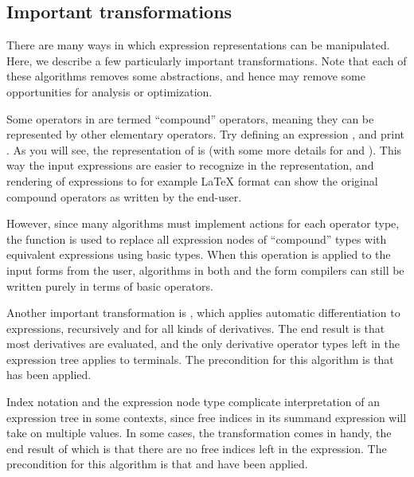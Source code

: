 \subsection{Important transformations} \label{ufl:sec:expanding}

There are many ways in which expression representations can be
manipulated.  Here, we describe a few particularly important
transformations.  Note that each of these algorithms removes some
abstractions, and hence may remove some opportunities for analysis or
optimization.

Some operators in \ufl{} are termed ``compound'' operators,
meaning they can be represented by other elementary operators.
Try defining an expression ,
and print . As you will see, the representation
of  is  (with some more
details for  and ).
This way the input expressions are easier to recognize in the
representation, and rendering of expressions to for example
\LaTeX{} format can show the original compound operators
as written by the end-user.

However, since many algorithms must implement actions for each
operator type, the function  is used to
replace all expression nodes of ``compound'' types with equivalent
expressions using basic types. When this operation is applied to the
input forms from the user, algorithms in both \ufl{} and the form
compilers can still be written purely in terms of basic operators.

Another important transformation is , which
applies automatic differentiation to expressions, recursively and for
all kinds of derivatives.  The end result is that most derivatives are
evaluated, and the only derivative operator types left in the
expression tree applies to terminals. The precondition for this
algorithm is that  has been applied.

Index notation and the  expression node type
complicate interpretation of an expression tree in some contexts,
since free indices in its summand expression will take on multiple
values.  In some cases, the transformation 
comes in handy, the end result of which is that there are no free
indices left in the expression.  The precondition for this algorithm
is that
 and 
have been applied.


